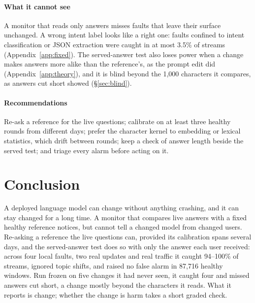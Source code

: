 \documentclass[11pt]{article}
\begin{document}
\paragraph{What it cannot see} A monitor that reads only answers misses faults
that leave their surface unchanged. A wrong intent label looks like a right one:
faults confined to intent classification or JSON extraction were caught in at most
3.5\% of streams (Appendix~\ref{app:fixed}). The served-answer test also loses power
when a change makes answers more alike than the reference's, as the prompt edit
did (Appendix~\ref{app:theory}), and it is blind beyond the 1{,}000 characters it
compares, as answers cut short showed (\S\ref{sec:blind}).

\paragraph{Recommendations} Re-ask a reference for the live questions; calibrate
on at least three healthy rounds from different days; prefer the character kernel
to embedding or lexical statistics, which drift between rounds; keep a check of
answer length beside the served test; and triage every alarm before acting on it.

\section{Conclusion}
A deployed language model can change without anything crashing, and it can stay
changed for a long time. A monitor that compares live answers with a fixed healthy
reference notices, but cannot tell a changed model from changed users. Re-asking a
reference the live questions can, provided its calibration spans several days, and
the served-answer test does so with only the answer each user received: across four
local faults, two real updates and real traffic it caught 94--100\% of streams,
ignored topic shifts, and raised no false alarm in 87{,}716 healthy windows. Run
frozen on five changes it had never seen, it caught four and missed answers cut
short, a change mostly beyond the characters it reads. What it reports is change;
whether the change is harm takes a short graded check.
\end{document}
